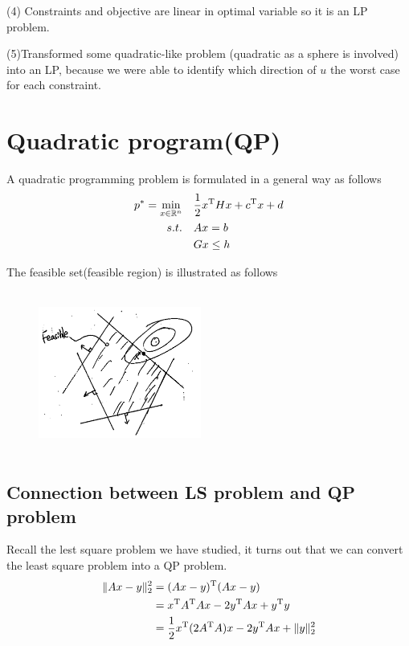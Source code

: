 (4) Constraints and objective are linear in optimal variable so it is an LP problem.

(5)Transformed some quadratic-like problem (quadratic as a sphere is involved) into an LP, because we were able to identify which direction of $u$ the worst case for each constraint.






\newpage

\section{Quadratic program(QP)}

A quadratic programming problem is formulated in a general way as follows
\begin{align*}
p^* = \min_{x\in \mathbb{R}^n}\quad &\frac{1}{2}x^{{\rm T}}Hx + c^{{\rm T}}x + d\\
 s.t.\quad &Ax = b\\
 &Gx\leq h
\end{align*}

The feasible set(feasible region) is illustrated as follows
\begin{figure}
	\centering
	\includegraphics[width=2.1in,height=2.1in]{figures/ch07/figure1016_a.png}
\end{figure}

\subsection{Connection between LS problem and QP problem}
Recall the lest square problem we have studied, it turns out that we can convert the least square problem into a QP problem.
\begin{align*}
\Vert Ax - y\Vert _2^2 &= (Ax - y)^{{\rm T}}(Ax - y)\\
&= x^{{\rm T}}A^{{\rm T}}Ax - 2y^{{\rm T}}Ax + y^{{\rm T}}y\\
&= \frac{1}{2}x^{{\rm T}}(2A^{{\rm T}}A)x - 2y^{{\rm T}}Ax + \Vert y\Vert _2^2
\end{align*}


